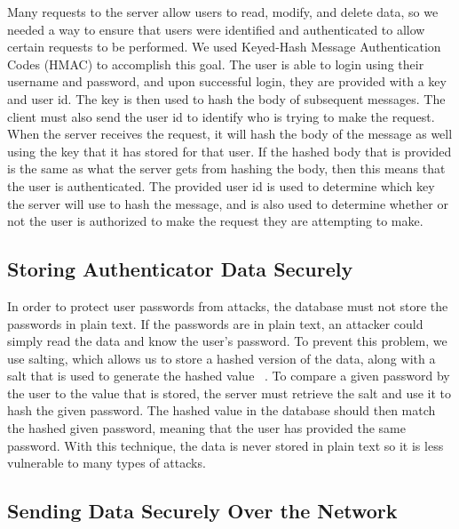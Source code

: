 \documentclass[12pt]{report}
\let\Oldsubsection\subsection
\renewcommand{\subsection}{\FloatBarrier\Oldsubsection}
\begin{document}
Many requests to the server allow users to read, modify, and delete data, so we needed a
way to ensure that users were identified and authenticated to allow certain requests to be
performed. We used Keyed-Hash Message Authentication Codes (HMAC) to accomplish this goal.
The user is able to login using their username and password, and upon successful login, they are
provided with a key and user id. The key is then used to hash the body of subsequent messages. 
The client must also send the user id to identify who is trying to
make the request. When the server receives the request, it will hash the body of the message as
well using the key that it has stored for that user. If the hashed body that is provided is the same
as what the server gets from hashing the body, then this means that the user is authenticated. The
provided user id is used to determine which key the server will use to hash the message, and is
also used to determine whether or not the user is authorized to make the request they are
attempting to make.

\subsection{Storing Authenticator Data Securely} \label{storing-authenticator-data-securely}

In order to protect user passwords from attacks, the database must not store the
passwords in plain text. If the passwords are in plain text, an attacker could simply read the data
and know the user’s password. To prevent this problem, we use salting, which allows us to store a 
hashed version of the data, along with a salt that is
used to generate the hashed value ~\autocite{PASSWORDSALTING}. To compare a given password by the user to the value that is
stored, the server must retrieve the salt and use it to hash the given password. The hashed value
in the database should then match the hashed given password, meaning that the user has provided
the same password. With this technique, the data is never stored in plain text so it is less
vulnerable to many types of attacks.

\subsection{Sending Data Securely Over the Network} \label{sending-data-securely-over-the-network}

\end{document}
